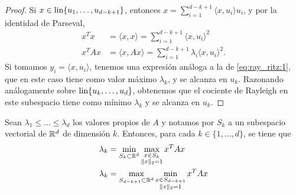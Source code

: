 \begin{proof}
    Si $x \in \operatorname{lin}\{u_1,\dots,u_{d-k+1}\}$, entonces $x = \sum_{i=1}^{d-k+1} \langle x, u_i \rangle u_i$, y por la identidad de Parseval,
    \begin{align*}
        x^Tx &= \langle x, x \rangle = \sum_{i=1}^{d-k+1} \langle x, u_i \rangle^2 \\
        x^TAx &= \langle x, Ax \rangle = \sum_{i=1}^{d-k+1} \lambda_i \langle x, u_i \rangle^2.
    \end{align*}
    Si tomamos $y_i = \langle x, u_i \rangle$, tenemos una expresión análoga a la de \ref{eq:ray_ritz:1}, que en este caso tiene como valor máximo $\lambda_k$, y se alcanza en $u_k$. Razonando análogamente sobre $\operatorname{lin}\{u_k,\dots,u_{d}\}$, obtenemos que el cociente de Rayleigh en este subespacio tiene como mínimo $\lambda_k$ y se alcanza en $u_k$.
\end{proof}

\begin{thm} \label{thm:courant_fischer}
    Sean $\lambda_1 \le \dots \le \lambda_d$ los valores propios de $A$ y notamos por $S_k$ a un subespacio vectorial de $\mathbb{R}^d$ de dimensión $k$. Entonces, para cada $k \in \{1,\dots,d\}$, se tiene que
    \begin{align}
        \lambda_k &= \min_{S_{k} \subset \mathbb{R}^d} \max_{\substack{x \in S_{k} \\ \|x\|_2 = 1}} x^TAx \label{eq:courant_fischer:1}\\ 
        \lambda_k &= \max_{S_{d-k+1} \subset \mathbb{R}^d} \min_{\substack{x \in S_{d-k+1} \\ \|x\|_2 = 1}} x^TAx \label{eq:courant_fischer:2}
    \end{align}
\end{thm}

